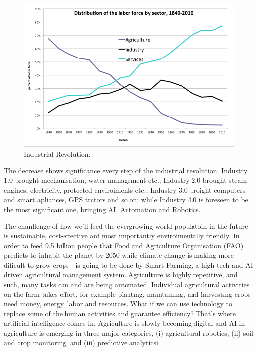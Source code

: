 \documentclass[10pt,jaurnal,compsoc]{IEEEtran}
\begin{document}
\begin{figure}[thpb]
      \centering
      \includegraphics[width=\linewidth]{agridecline}
      \caption{Industrial Revolution.}
      \label{fig:robot1}
\end{figure}

The decrease shows significance every step of the industrial revolution. Industry 1.0 brought mechanisation, water management etc.; Industry 2.0 brought steam engines, electricity, protected enviroiments etc.; Industry 3.0 broight computers and smart apliances, GPS trctors and so on; while Industry 4.0 is foreseen to be the most significant one, bringing AI, Automation and Robotics.

The chanllenge of how we'll feed the evergrowing world populatoin in the future - is sustainable, cost-effective anf most importantly enviroimentally friendly. In order to feed 9.5 billion people that Food and Agriculture Organisation (FAO) predicts to inhabit the planet by 2050 while climate change is making more dificult to grow crops - is going to be done by Smart Farming, a high-tech and AI driven agricultural management system. Agriculture is highly repetitive, and such, many tasks can and are being automated. Individual agricultural activities on the farm takes effort, for example planting, maintaining, and harvesting crops need money, energy, labor and resources. What if we can use technology to replace some of the human activities and guarantee efficiency? That’s where artificial intelligence comes in. Agriculture is slowly becoming digital and AI in agriculture is emerging in three major categories, (i) agricultural robotics, (ii) soil and crop monitoring, and (iii) predictive analyticsi \cite{Giusti_2016}
\end{document}
